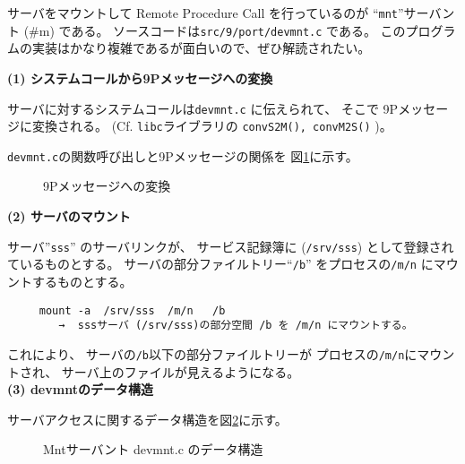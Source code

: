 サーバをマウントして Remote Procedure Call を行っているのが
``{\tt mnt}''サーバント (\#m) である。
ソースコードは{\tt src/9/port/devmnt.c} である。 
このプログラムの実装はかなり複雑であるが面白いので、ぜひ解読されたい。


{\bf\flushleft (1) システムコールから9Pメッセージへの変換}

サーバに対するシステムコールは{\tt devmnt.c} に伝えられて、
そこで 9Pメッセージに変換される。
(Cf. {\tt libc}ライブラリの {\tt convS2M(), convM2S()} )。

{\tt devmnt.c}の関数呼び出しと9Pメッセージの関係を
図\ref{fig:syscall-9pmsg}に示す。
\\


\begin{figure}[htb]
  \begin{center}
   \epsfxsize=440pt
    \caption{9Pメッセージへの変換}
    \label{fig:syscall-9pmsg}
  \end{center}
\end{figure}



{\bf\flushleft (2) サーバのマウント}

  サーバ''{\tt sss}'' のサーバリンクが、
サービス記録簿に ({\tt /srv/sss}) として登録されているものとする。
サーバの部分ファイルトリー``{\tt /b}'' をプロセスの{\tt /m/n}
にマウントするものとする。

\begin{verbatim}
     mount -a  /srv/sss  /m/n   /b
        →  sssサーバ (/srv/sss)の部分空間 /b を /m/n にマウントする。
\end{verbatim}


これにより、
サーバの{\tt /b}以下の部分ファイルトリーが
プロセスの{\tt /m/n}にマウントされ、
サーバ上のファイルが見えるようになる。
\\

{\bf\flushleft (3) devmntのデータ構造}


サーバアクセスに関するデータ構造を図\ref{fig:devmnt}に示す。

\begin{figure}[hbt]
  \begin{center}
   \epsfxsize=440pt
    \caption{Mntサーバント devmnt.c のデータ構造}
    \label{fig:devmnt}
  \end{center}
\end{figure}


